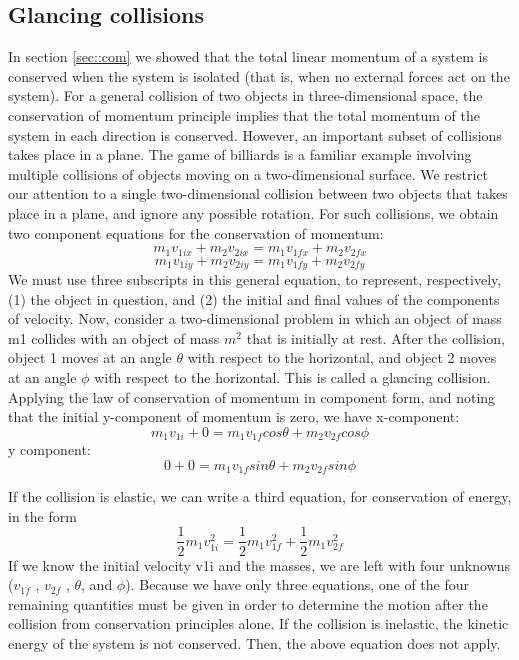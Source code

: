 \subsection{Glancing collisions}
In section \ref{sec::com}  we showed that the total linear momentum of a system is conserved when the system is isolated (that is, when no external forces act on the system). For a general collision of two objects in three-dimensional space, the conservation of momentum principle implies that the total momentum of the system in each direction is conserved. However, an important subset of collisions takes place in a plane. The game of billiards is a familiar example involving multiple collisions of objects moving on a two-dimensional surface. We restrict our attention to a single two-dimensional collision between two objects that takes place in a plane, and ignore any possible rotation. For such collisions, we obtain two component equations
for the conservation of momentum:
$$m_1v_{1ix}+m_2v_{2ix}= m_1v_{1f x}+ m_2v_{2f x}$$
$$m_1v_{1iy}+m_2v_{2iy}= m_1v_{1f y}+ m_2v_{2f y}$$
We must use three subscripts in this general equation, to represent, respectively, (1) the object in question, and (2) the initial and final values of the components of velocity. Now, consider a two-dimensional problem in which an object of mass m1 collides with an object of mass $m^2$ that is initially at rest. After the collision, object 1 moves at an angle $\theta$ with respect to the horizontal, and object 2 moves at an angle $\phi$ with respect to the horizontal. This is called a glancing collision. Applying the law of conservation of momentum in component form, and noting that the initial y-component of momentum is zero, we have x-component: $$m_1v_{1i}+ 0=m_1v_{1f}cos \theta+m_2v_{2f}cos \phi$$
y component: $$0+ 0=m_1v_{1f}sin \theta+m_2v_{2f}sin \phi$$

If the collision is elastic, we can write a third equation, for conservation of energy,
in the form
$$\frac{1}{2}m_1v_{1i}^2 = \frac{1}{2}m_1v_{1f}^2 + \frac{1}{2}m_1v_{2f}^2$$
If we know the initial velocity v1i and the masses, we are left with four unknowns
($v_{1f}$ , $v_{2f}$ , $\theta$, and $\phi$). Because we have only three equations, one of the four remaining
quantities must be given in order to determine the motion after the collision from conservation principles alone.
If the collision is inelastic, the kinetic energy of the system is not conserved. Then, the above equation does not apply.

